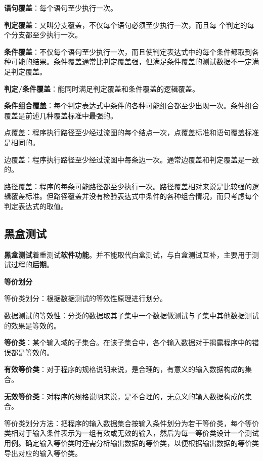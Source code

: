 \documentclass[cn, blue, normal, 12pt]{elegantnote}
\begin{document}
\textbf{语句覆盖}：每个语句至少执行一次。

\textbf{判定覆盖}：又叫分支覆盖，不仅每个语句必须至少执行一次，而且每
个判定的每个分支都至少执行一次。

\textbf{条件覆盖}：不仅每个语句至少执行一次，而且使判定表达式中的每个条件都取到各种可能的结果。条件覆盖通常比判定覆盖强，但满足条件覆盖的测试数据不一定满足判定覆盖。

\textbf{判定/条件覆盖}：能同时满足判定覆盖和条件覆盖的逻辑覆盖。

\textbf{条件组合覆盖}：每个判定表达式中条件的各种可能组合都至少出现一次。条件组合覆盖是前述几种覆盖标准中最强的。

点覆盖：程序执行路径至少经过流图的每个结点一次，点覆盖标准和语句覆盖标准是相同的。

边覆盖：程序执行路径至少经过流图中每条边一次。通常边覆盖和判定覆盖是一致的。

路径覆盖：程序的每条可能路径都至少执行一次。路径覆盖相对来说是比较强的逻辑覆盖标准。但路径覆盖并没有检验表达式中条件的各种组合情况，而只考虑每个判定表达式的取值。

\subsection{黑盒测试}

\textbf{黑盒测试}着重测试\textbf{软件功能}。并不能取代白盒测试，与白盒测试互补，主要用于测试过程的\textbf{后期}。

\textbf{等价划分}

等价类划分：根据数据测试的等效性原理进行划分。

数据测试的等效性：分类的数据取其子集中一个数据做测试与子集中其他数据测试的效果是等效的。

\textbf{等价类}：某个输入域的子集合。在该子集合中，各个输入数据对于揭露程序中的错误都是等效的。

\textbf{有效等价类}：对于程序的规格说明来说，是合理的，有意义的输入数据构成的集合。

\textbf{无效等价类}：对程序的规格说明来说，是不合理的，无意义的输入数据构成的集合。

等价类划分方法：把程序的输入数据集合按输入条件划分为若干等价类，每个等价类相对于输入条件表示为一组有效或无效的输入，然后为每一等价类设计一个测试用例。确定输入等价类时还需分析输出数据的等价类，以便根据输出数据的等价类导出对应的输入等价类。
\end{document}
